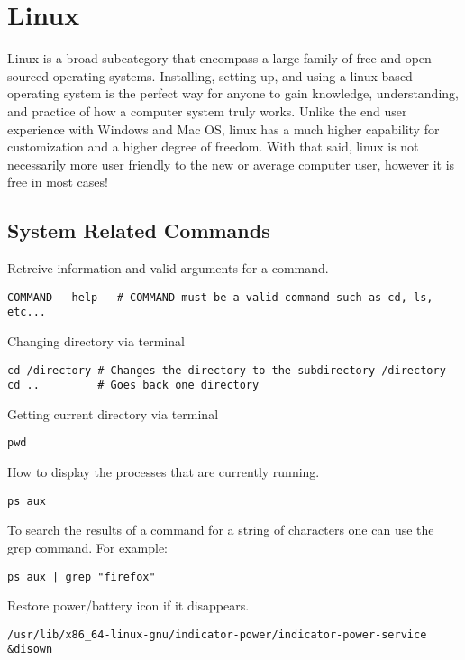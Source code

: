 \chapter{Linux}
\thispagestyle{fancy}
\lstset{language=Bash, style=bash}

Linux is a broad subcategory that encompass a large family of free and open sourced operating systems. Installing, setting up, and using a linux based operating system is the perfect way for anyone to gain knowledge, understanding, and practice of how a computer system truly works. Unlike the end user experience with Windows and Mac OS, linux has a much higher capability for customization and a higher degree of freedom. With that said, linux is not necessarily more user friendly to the new or average computer user, however it is free in most cases!

\section{System Related Commands}

Retreive information and valid arguments for a command.
\begin{lstlisting}
COMMAND --help   # COMMAND must be a valid command such as cd, ls, etc...
\end{lstlisting}

Changing directory via terminal
\begin{lstlisting}
cd /directory # Changes the directory to the subdirectory /directory
cd ..         # Goes back one directory
\end{lstlisting}

Getting current directory via terminal
\begin{lstlisting}
pwd
\end{lstlisting}

How to display the processes that are currently running.
\begin{lstlisting}
ps aux
\end{lstlisting}

To search the results of a command for a string of characters one can use the grep command. For example:
\begin{lstlisting}
ps aux | grep "firefox"
\end{lstlisting}

Restore power/battery icon if it disappears.
\begin{lstlisting}
/usr/lib/x86_64-linux-gnu/indicator-power/indicator-power-service &disown 
\end{lstlisting}

